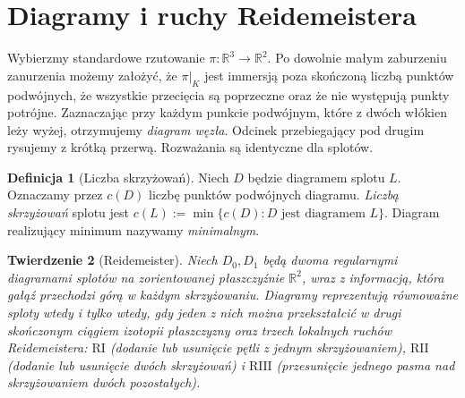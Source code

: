\documentclass[11pt,a4paper]{report}
\numberwithin{equation}{section}
\theoremstyle{plain}
\newtheorem{twierdzenie}{Twierdzenie}[section]
\theoremstyle{definition}
\newtheorem{definicja}[twierdzenie]{Definicja}
\theoremstyle{remark}
\begin{document}
\section{Diagramy i ruchy Reidemeistera}
\label{sec:kt-diagramy}

Wybierzmy standardowe rzutowanie $\pi\colon\mathbb R^3\to\mathbb R^2$.
Po dowolnie małym zaburzeniu zanurzenia możemy założyć, że $\pi|_K$
jest immersją poza skończoną liczbą punktów podwójnych, że wszystkie
przecięcia są poprzeczne oraz że nie występują punkty potrójne.
Zaznaczając przy każdym punkcie podwójnym, które z dwóch włókien
leży wyżej, otrzymujemy \emph{diagram węzła}. Odcinek przebiegający
pod drugim rysujemy z krótką przerwą. Rozważania są identyczne dla
splotów.

\begin{center}
\end{center}

\begin{definicja}[Liczba skrzyżowań]
Niech $D$ będzie diagramem splotu $L$. Oznaczamy przez $c(D)$ liczbę
punktów podwójnych diagramu. \emph{Liczbą skrzyżowań} splotu jest
$c(L):=\min\{c(D):D\text{ jest diagramem }L\}$. Diagram realizujący
minimum nazywamy \emph{minimalnym}.
\end{definicja}

\begin{twierdzenie}[Reidemeister]
Niech $D_0,D_1$ będą dwoma regularnymi diagramami splotów
na zorientowanej płaszczyźnie $\mathbb R^2$, wraz z informacją,
która gałąź przechodzi górą w każdym skrzyżowaniu. Diagramy reprezentują równoważne sploty wtedy
i tylko wtedy, gdy jeden z nich można przekształcić w drugi
skończonym ciągiem izotopii płaszczyzny oraz trzech lokalnych
ruchów Reidemeistera: $\mathrm{R I}$ (dodanie lub usunięcie
pętli z jednym skrzyżowaniem), $\mathrm{R II}$ (dodanie lub
usunięcie dwóch skrzyżowań) i $\mathrm{R III}$ (przesunięcie
jednego pasma nad skrzyżowaniem dwóch pozostałych).
\end{twierdzenie}
\end{document}
